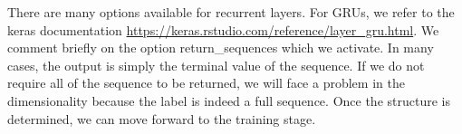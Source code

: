 \documentclass[]{krantz}
\makeatletter
\newenvironment{Shaded}{\begin{snugshade}}{\end{snugshade}}
\newcommand{\CommentTok}[1]{\textcolor[rgb]{0.37,0.37,0.37}{\textit{#1}}}
\newcommand{\DataTypeTok}[1]{\textcolor[rgb]{0.27,0.27,0.27}{#1}}
\newcommand{\DecValTok}[1]{\textcolor[rgb]{0.06,0.06,0.06}{#1}}
\newcommand{\KeywordTok}[1]{\textcolor[rgb]{0.27,0.27,0.27}{\textbf{#1}}}
\newcommand{\NormalTok}[1]{#1}
\newcommand{\OperatorTok}[1]{\textcolor[rgb]{0.43,0.43,0.43}{\textbf{#1}}}
\newcommand{\OtherTok}[1]{\textcolor[rgb]{0.37,0.37,0.37}{#1}}
\newcommand{\StringTok}[1]{\textcolor[rgb]{0.5,0.5,0.5}{#1}}
\newenvironment{kframe}{%
\medskip{}
\setlength{\fboxsep}{.8em}
 \def\at@end@of@kframe{}%
 \ifinner\ifhmode%
  \def\at@end@of@kframe{\end{minipage}}%
  \begin{minipage}{\columnwidth}%
 \fi\fi%
 \def\FrameCommand##1{\hskip\@totalleftmargin \hskip-\fboxsep
 \colorbox{shadecolor}{##1}\hskip-\fboxsep
     \hskip-\linewidth \hskip-\@totalleftmargin \hskip\columnwidth}%
 \MakeFramed {\advance\hsize-\width
   \@totalleftmargin\z@ \linewidth\hsize
   \@setminipage}}%
 {\par\unskip\endMakeFramed%
 \at@end@of@kframe}
\renewenvironment{Shaded}{\begin{kframe}}{\end{kframe}}
\theoremstyle{definition}
\theoremstyle{definition}
\theoremstyle{definition}
\theoremstyle{remark}
\makeatother
\begin{document}
\footnotesize

\begin{Shaded}
\end{Shaded}

\normalsize

There are many options available for recurrent layers. For GRUs, we
refer to the keras documentation
\url{https://keras.rstudio.com/reference/layer_gru.html}. We comment
briefly on the option return\_sequences which we activate. In many
cases, the output is simply the terminal value of the sequence. If we do
not require all of the sequence to be returned, we will face a problem
in the dimensionality because the label is indeed a full sequence. Once
the structure is determined, we can move forward to the training stage.

\footnotesize
\end{document}
